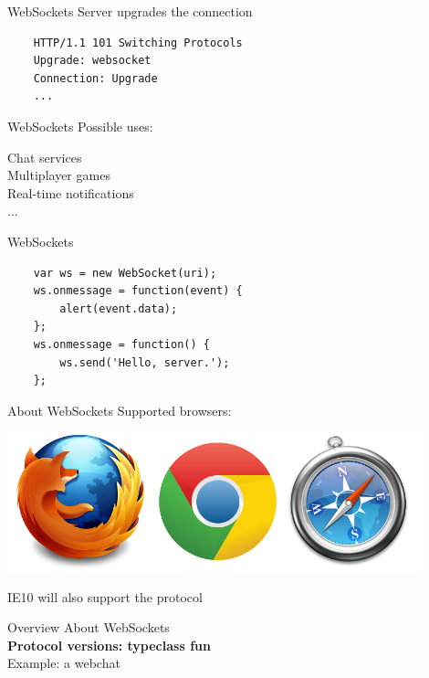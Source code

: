 \documentclass[20pt]{beamer}
\newcommand{\vspaced}{
    \vspace{5mm}
}
\begin{document}
\begin{frame}[fragile]{WebSockets}
    Server upgrades the connection
    \vspaced
    \begin{lstlisting}
    HTTP/1.1 101 Switching Protocols
    Upgrade: websocket
    Connection: Upgrade
    ...
    \end{lstlisting}
\end{frame}

\begin{frame}{WebSockets}
    Possible uses: \\
    \vspaced
    Chat services \\
    Multiplayer games \\
    Real-time notifications \\
    ...
\end{frame}

\begin{frame}[fragile]{WebSockets}
    \begin{lstlisting}
    var ws = new WebSocket(uri);
    ws.onmessage = function(event) {
        alert(event.data);
    };
    ws.onmessage = function() {
        ws.send('Hello, server.');
    };
    \end{lstlisting}
\end{frame}

\begin{frame}{About WebSockets}
    Supported browsers:
    \begin{center}
    \includegraphics[width=0.9\textwidth]{images/browsers.png}
    \end{center}
    IE10 will also support the protocol
\end{frame}


\begin{frame}{Overview}
    About WebSockets \\
    \textbf{Protocol versions: typeclass fun} \\
    Example: a webchat \\
\end{frame}
\end{document}
